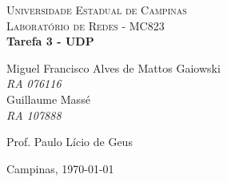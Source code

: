 \begin{titlepage}

\newcommand{\HRule}{\rule{\linewidth}{0.5mm}} 
 
\begin{center}
 

\textsc{\LARGE Universidade Estadual de Campinas}\\[0.5cm]
\textsc{\Large Laboratório de Redes - MC823}
{\ }\\[4.5cm]
 
{ \huge \bfseries Tarefa 3 - UDP}\\[3.0cm]
 
\begin{flushright}
Miguel Francisco Alves de Mattos Gaiowski \\
\emph{RA 076116} \\
Guillaume Massé\\
\emph{RA 107888} \\[2.0cm]


\end{flushright}


\begin{flushright}
Prof. Paulo Lício de Geus \\
\end{flushright}
 
\vfill
 
{\large Campinas, \today}
 
\end{center}
 
\end{titlepage}
